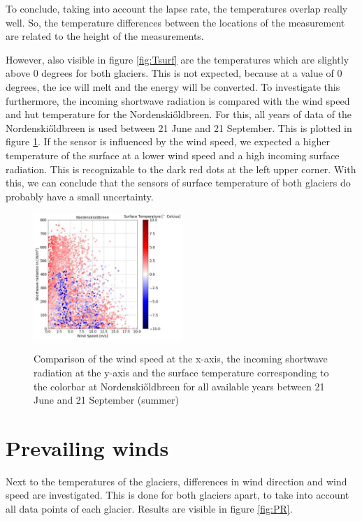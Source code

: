 \documentclass[11pt]{report}
\begin{document}
To conclude, taking into account the lapse rate, the temperatures overlap really well. So, the temperature differences between the locations of the measurement are related to the height of the measurements.

However, also visible in figure \ref{fig:Tsurf} are the temperatures which are slightly above 0 degrees for both glaciers. This is not expected, because at a value of 0 degrees, the ice will melt and the energy will be converted. To investigate this furthermore, the incoming shortwave radiation is compared with the wind speed and hut temperature for the Nordenski\H{o}ldbreen. For this, all years of data of the Nordenski\H{o}ldbreen is used between 21 June and 21 September. This is plotted in figure \ref{fig:Thut}. If the sensor is influenced by the wind speed, we expected a higher temperature of the surface at a lower wind speed and a high incoming surface radiation. This is recognizable to the dark red dots at the left upper corner. With this, we can conclude that the sensors of surface temperature of both glaciers do probably have a small uncertainty.

\begin{figure}[h]
\centering{}
    \includegraphics[scale=0.5, width=0.5\textwidth]{Thut-Sin.jpg}
    \label{fig:Thut}
    \caption{Comparison of the wind speed at the x-axis, the incoming shortwave radiation at the y-axis and the surface temperature corresponding to the colorbar at Nordenski\H{o}ldbreen for all available years between 21 June and 21 September (summer) }
\end{figure}

\section{Prevailing winds}\label{sec:katw}
Next to the temperatures of the glaciers, differences in wind direction and wind speed are investigated. This is done for both glaciers apart, to take into account all data points of each glacier. Results are visible in figure \ref{fig:PR}.
\end{document}
